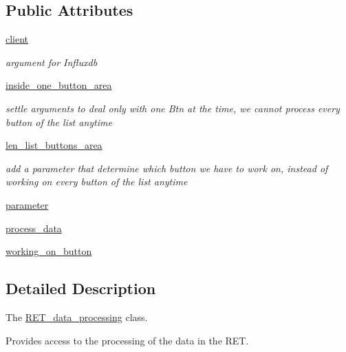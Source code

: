 \subsection*{Public Attributes}
\begin{DoxyCompactItemize}
\item 
\hyperlink{classRET__data__processing_1_1RET__data__processing_ad5bc32b75da65fe60067f501a4bb6665}{client}
\begin{DoxyCompactList}\small\item\em argument for Influxdb \end{DoxyCompactList}\item 
\hyperlink{classRET__data__processing_1_1RET__data__processing_af140727efa8da9cde0e592a61407d62f}{inside\+\_\+one\+\_\+button\+\_\+area}
\begin{DoxyCompactList}\small\item\em settle arguments to deal only with one Btn at the time, we cannot process every button of the list anytime \end{DoxyCompactList}\item 
\hyperlink{classRET__data__processing_1_1RET__data__processing_acbbf8e6a1d50b851956b602b4b62407d}{len\+\_\+list\+\_\+buttons\+\_\+area}
\begin{DoxyCompactList}\small\item\em add a parameter that determine which button we have to work on, instead of working on every button of the list anytime \end{DoxyCompactList}\item 
\hyperlink{classRET__data__processing_1_1RET__data__processing_a0d71b5c1dcca8d3fee88d6a11d3e2071}{parameter}
\item 
\hyperlink{classRET__data__processing_1_1RET__data__processing_ae694f95e6ad7f44763d44d68466b8011}{process\+\_\+data}
\item 
\hyperlink{classRET__data__processing_1_1RET__data__processing_a96204c1a4417d5a3a980521f8a66a1fa}{working\+\_\+on\+\_\+button}
\end{DoxyCompactItemize}


\subsection{Detailed Description}
The \hyperlink{classRET__data__processing_1_1RET__data__processing}{R\+E\+T\+\_\+data\+\_\+processing} class. 

Provides access to the processing of the data in the R\+ET. 

